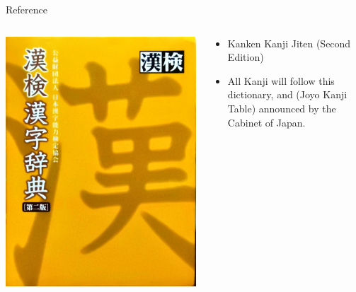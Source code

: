 \documentclass[12pt,aspectratio=169]{beamer}
\newenvironment{items}
	{\begin{itemize}
		\setlength\itemsep{5pt}
	}{\end{itemize}}
\begin{document}
	\begin{frame}{Reference}
		\begin{columns}[T]
		\begin{column}{.3\textwidth}
			\begin{block}{}
				\includegraphics[height=0.8\textheight]{images/kanji-jiten.jpg}
			\end{block}
		\end{column}
			\begin{column}{.6\textwidth}
				\begin{block}{}
					\begin{items}
						\item Kanken Kanji Jiten (Second Edition)
						\item All Kanji will follow this dictionary, and  (Joyo Kanji Table) announced by the Cabinet of Japan.
					\end{items}
				\end{block}
			\end{column}
		\end{columns}
	\end{frame}
\end{document}
